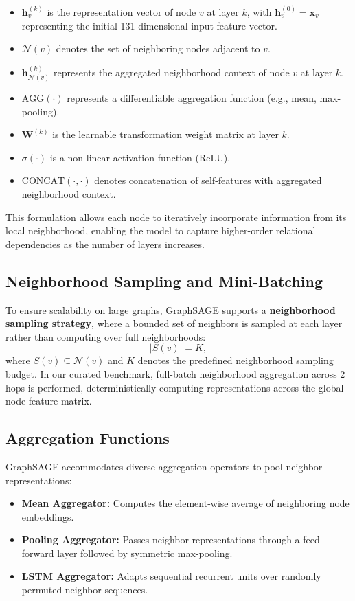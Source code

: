 \documentclass[conference,a4paper]{IEEEtran}
\begin{document}
\begin{itemize}
    \item $\mathbf{h}_v^{(k)}$ is the representation vector of node $v$ at layer $k$, with $\mathbf{h}_v^{(0)} = \mathbf{x}_v$ representing the initial 131-dimensional input feature vector.
    \item $\mathcal{N}(v)$ denotes the set of neighboring nodes adjacent to $v$.
    \item $\mathbf{h}_{\mathcal{N}(v)}^{(k)}$ represents the aggregated neighborhood context of node $v$ at layer $k$.
    \item $\mathrm{AGG}(\cdot)$ represents a differentiable aggregation function (e.g., mean, max-pooling).
    \item $\mathbf{W}^{(k)}$ is the learnable transformation weight matrix at layer $k$.
    \item $\sigma(\cdot)$ is a non-linear activation function (ReLU).
    \item $\mathrm{CONCAT}(\cdot, \cdot)$ denotes concatenation of self-features with aggregated neighborhood context.
\end{itemize}
This formulation allows each node to iteratively incorporate information from its local neighborhood, enabling the model to capture higher-order relational dependencies as the number of layers increases.

\subsection{Neighborhood Sampling and Mini-Batching}
To ensure scalability on large graphs, GraphSAGE supports a \textbf{neighborhood sampling strategy}, where a bounded set of neighbors is sampled at each layer rather than computing over full neighborhoods:
\begin{equation}
    |S(v)| = K,
\end{equation}
where $S(v) \subseteq \mathcal{N}(v)$ and $K$ denotes the predefined neighborhood sampling budget. In our curated benchmark, full-batch neighborhood aggregation across 2 hops is performed, deterministically computing representations across the global node feature matrix.

\subsection{Aggregation Functions}
GraphSAGE accommodates diverse aggregation operators to pool neighbor representations:
\begin{itemize}
    \item \textbf{Mean Aggregator:} Computes the element-wise average of neighboring node embeddings.
    \item \textbf{Pooling Aggregator:} Passes neighbor representations through a feed-forward layer followed by symmetric max-pooling.
    \item \textbf{LSTM Aggregator:} Adapts sequential recurrent units over randomly permuted neighbor sequences.
\end{itemize}
\end{document}
